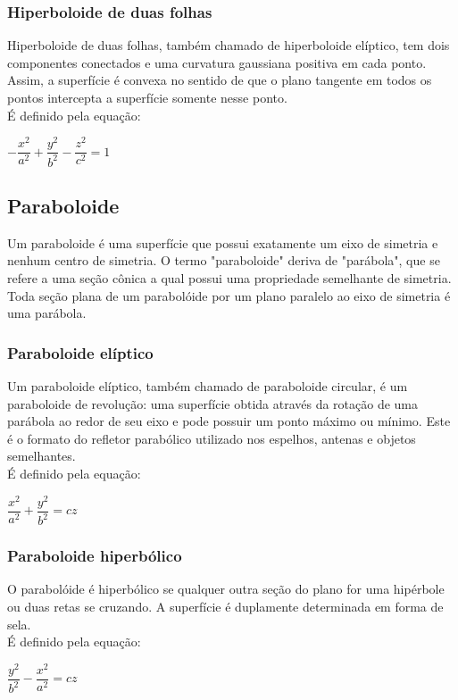 \documentclass[12 pt, a4 paper]{article}
\begin{document}
\subsubsection{Hiperboloide de duas folhas}
Hiperboloide de duas folhas, também chamado de hiperboloide elíptico, tem dois componentes conectados e uma curvatura gaussiana positiva em cada ponto. Assim, a superfície é convexa no sentido de que o plano tangente em todos os pontos intercepta a superfície somente nesse ponto.
\\
É definido pela equação:
\begin{center}
$-\dfrac{x^2}{a^2} + \dfrac{y^2}{b^2} - \dfrac{z^2}{c^2} = 1$
\end{center}

\subsection{Paraboloide}
Um paraboloide é uma superfície que possui exatamente um eixo de simetria e nenhum centro de simetria. O termo "paraboloide" deriva de "parábola", que se refere a uma seção cônica a qual possui uma propriedade semelhante de simetria. Toda seção plana de um parabolóide por um plano paralelo ao eixo de simetria é uma parábola.

\subsubsection{Paraboloide elíptico}
Um paraboloide elíptico, também chamado de paraboloide circular, é um paraboloide de revolução: uma superfície obtida através da rotação de uma parábola ao redor de seu eixo e pode possuir um ponto máximo ou mínimo. Este é o formato do refletor parabólico utilizado nos espelhos, antenas e objetos semelhantes.
\\É definido pela equação:
\begin{center}
$\dfrac{x^2}{a^2} + \dfrac{y^2}{b^2} = cz$
\end{center}

\subsubsection{Paraboloide hiperbólico}
O parabolóide é hiperbólico se qualquer outra seção do plano for uma hipérbole ou duas retas se cruzando. A superfície é duplamente determinada em forma de sela.
\\É definido pela equação:
\begin{center}
$\dfrac{y^2}{b^2} - \dfrac{x^2}{a^2} = cz$
\end{center}
\end{document}
